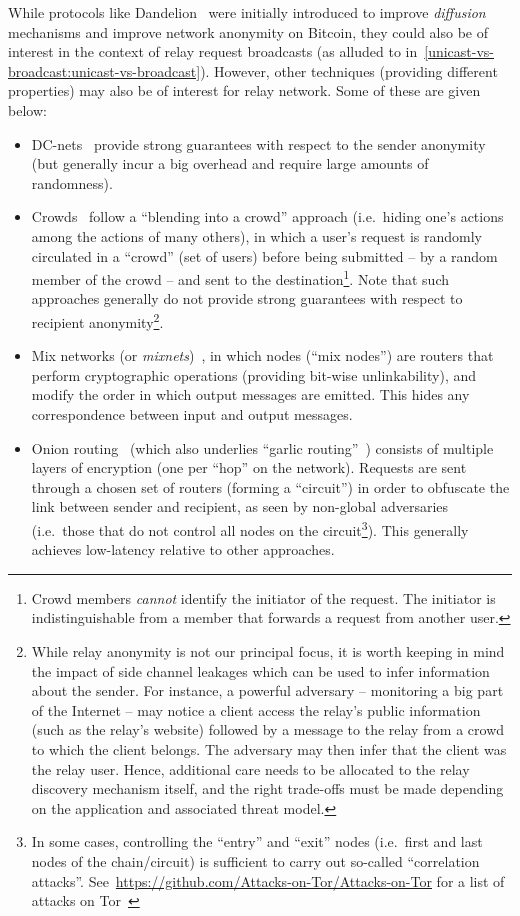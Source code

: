 While protocols like Dandelion~\cite{DBLP:journals/pomacs/Venkatakrishnan17,DBLP:journals/pomacs/FantiVBDBMV18} were initially introduced to improve \emph{diffusion} mechanisms and improve network anonymity on Bitcoin, they could also be of interest in the context of relay request broadcasts (as alluded to in~\cref{unicast-vs-broadcast:unicast-vs-broadcast}).
However, other techniques (providing different properties) may also be of interest for relay network. Some of these are given below:
\begin{itemize}
    \item DC-nets~\cite{DBLP:journals/joc/Chaum88} provide strong guarantees with respect to the sender anonymity (but generally incur a big overhead and require large amounts of randomness).
    \item Crowds~\cite{DBLP:journals/tissec/ReiterR98} follow a ``blending into a crowd'' approach (i.e.~hiding one's actions among the actions of many others), in which a user's request is randomly circulated in a ``crowd'' (set of users) before being submitted -- by a random member of the crowd -- and sent to the destination\footnote{Crowd members \emph{cannot} identify the initiator of the request. The initiator is indistinguishable from a member that forwards a request from another user.}. Note that such approaches generally do not provide strong guarantees with respect to recipient anonymity\footnote{While relay anonymity is not our principal focus, it is worth keeping in mind the impact of side channel leakages which can be used to infer information about the sender. For instance, a powerful adversary -- monitoring a big part of the Internet -- may notice a client access the relay's public information (such as the relay's website) followed by a message to the relay from a crowd to which the client belongs. The adversary may then infer that the client was the relay user. Hence, additional care needs to be allocated to the relay discovery mechanism itself, and the right trade-offs must be made depending on the application and associated threat model.}.
    \item Mix networks (or \emph{mixnets})~\cite{DBLP:series/ais/Chaum03}, in which nodes (``mix nodes'') are routers that perform cryptographic operations (providing bit-wise unlinkability), and modify the order in which output messages are emitted. This hides any correspondence between input and output messages.
    \item Onion routing~\cite{DBLP:journals/cacm/GoldschlagRS99} (which also underlies ``garlic routing''~\cite{garlic-nets}) consists of multiple layers of encryption (one per ``hop'' on the network). Requests are sent through a chosen set of routers (forming a ``circuit'') in order to obfuscate the link between sender and recipient, as seen by non-global adversaries (i.e.~those that do not control all nodes on the circuit\footnote{In some cases, controlling the ``entry'' and ``exit'' nodes (i.e.~first and last nodes of the chain/circuit) is sufficient to carry out so-called ``correlation attacks''. See~\url{https://github.com/Attacks-on-Tor/Attacks-on-Tor} for a list of attacks on Tor~\cite{DBLP:conf/uss/DingledineMS04}}). This generally achieves low-latency relative to other approaches.
\end{itemize}

